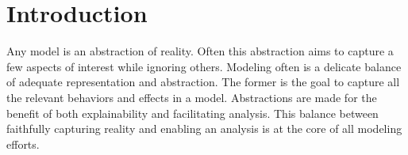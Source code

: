 \chapter{Introduction}


Any model is an abstraction of reality.
Often this abstraction aims to capture a few aspects of interest while ignoring others.
Modeling often is a delicate balance of adequate representation and abstraction.
The former is the goal to capture all the relevant behaviors and effects in a model.
Abstractions are made for the benefit of both explainability and facilitating analysis.
This balance between faithfully capturing reality and enabling an analysis is at the core of all modeling efforts.


